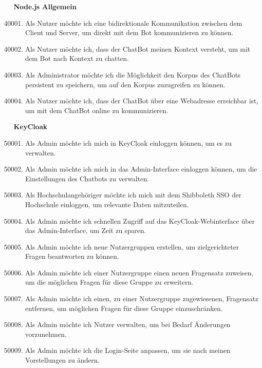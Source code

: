 \textbf{Node.js Allgemein}
\begin{enumerate}[leftmargin=*,labelindent=40pt,label=u\arabic*.]
    \setcounter{enumi}{40000}
    \item Als Nutzer möchte ich eine bidirektionale Kommunikation zwischen dem Client und Server, um direkt mit dem Bot kommunizieren zu können.
    \item Als Nutzer möchte ich, dass der ChatBot meinen Kontext versteht, um mit dem Bot nach Kontext zu chatten.
    \item Als Administrator möchte ich die Möglichkeit den Korpus des ChatBots persistent zu speichern, um auf den Korpus zuzugreifen zu können.
    \item Als Nutzer möchte ich, dass der ChatBot über eine Webadresse erreichbar ist, um mit dem ChatBot online zu kommunizieren.
\end{enumerate}

\textbf{KeyCloak}
\begin{enumerate}[leftmargin=*,labelindent=40pt,label=u\arabic*.]
    \setcounter{enumi}{50000}
    \item Als Admin möchte ich mich in KeyCloak einloggen können, um es zu verwalten.
    \item Als Admin möchte ich mich in das Admin-Interface einloggen können, um die Einstellungen des Chatbots zu verwalten.
    \item Als Hochschulangehöriger möchte ich mich mit dem Shibboleth SSO der Hochschule einloggen, um relevante Daten mitzuteilen.
    \item Als Admin möchte ich schnellen Zugriff auf das KeyCloak-Webinterface über das Admin-Interface, um Zeit zu sparen.
    \item Als Admin möchte ich neue Nutzergruppen erstellen, um zielgerichteter Fragen beantworten zu können.
    \item Als Admin möchte ich einer Nutzergruppe einen neuen Fragensatz zuweisen, um die möglichen Fragen für diese Gruppe zu erweitern.
    \item Als Admin möchte ich einen, zu einer Nutzergruppe zugewiesenen, Fragensatz entfernen, um möglichen Fragen für diese Gruppe einzuschränken.
    \item Als Admin möchte ich Nutzer verwalten, um bei Bedarf Änderungen vorzunehmen.
    \item Als Admin möchte ich die Login-Seite anpassen, um sie nach meinen Vorstellungen zu ändern.
\end{enumerate}



